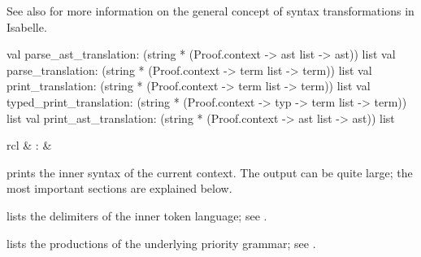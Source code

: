 \begin{isabellebody}
\begin{isamarkuptext}
  See also \cite{isabelle-ref} for more information on the general
  concept of syntax transformations in Isabelle.

\begin{ttbox}
val parse_ast_translation:
  (string * (Proof.context -> ast list -> ast)) list
val parse_translation:
  (string * (Proof.context -> term list -> term)) list
val print_translation:
  (string * (Proof.context -> term list -> term)) list
val typed_print_translation:
  (string * (Proof.context -> typ -> term list -> term)) list
val print_ast_translation:
  (string * (Proof.context -> ast list -> ast)) list
\end{ttbox}%
\end{isamarkuptext}%
\isamarkuptrue%
%
\isamarkuptrue%
%
\begin{isamarkuptext}%
\begin{matharray}{rcl}
    \hypertarget{command.print-syntax}{\hyperlink{command.print-syntax}{\mbox{}}} & : &  \\
  \end{matharray}

  \begin{description}

  \item \hyperlink{command.print-syntax}{\mbox{}} prints the inner syntax of the
  current context.  The output can be quite large; the most important
  sections are explained below.

  \begin{description}

  \item {} lists the delimiters of the inner token
  language; see .

  \item {} lists the productions of the underlying
  priority grammar; see .


\end{description}
\end{description}
\end{isamarkuptext}
\end{isabellebody}
